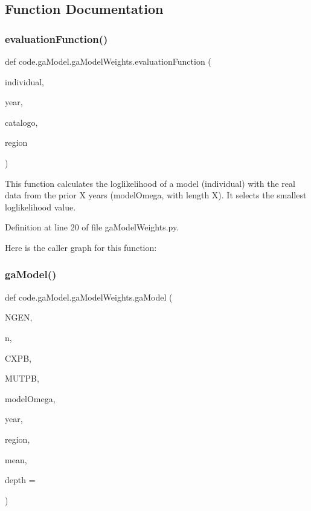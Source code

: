 \subsection{Function Documentation}
\mbox{\label{namespacecode_1_1ga_model_1_1ga_model_weights_a391a75f316a29e0dfba1b8adda65c526}} 
\subsubsection{\texorpdfstring{evaluation\+Function()}{evaluationFunction()}}
{\footnotesize\ttfamily def code.\+ga\+Model.\+ga\+Model\+Weights.\+evaluation\+Function (\begin{DoxyParamCaption}\item[{}]{individual,  }\item[{}]{year,  }\item[{}]{catalogo,  }\item[{}]{region }\end{DoxyParamCaption})}

\begin{DoxyVerb}This function calculates the loglikelihood of a model (individual) with 
the real data from the prior X years (modelOmega, with length X).
It selects the smallest loglikelihood value.
\end{DoxyVerb}
 

Definition at line 20 of file ga\+Model\+Weights.\+py.

Here is the caller graph for this function\+:
\mbox{\label{namespacecode_1_1ga_model_1_1ga_model_weights_ad5f42777ce1e884bfb1cc58fa17e432b}} 
\subsubsection{\texorpdfstring{ga\+Model()}{gaModel()}}
{\footnotesize\ttfamily def code.\+ga\+Model.\+ga\+Model\+Weights.\+ga\+Model (\begin{DoxyParamCaption}\item[{}]{N\+G\+EN,  }\item[{}]{n,  }\item[{}]{C\+X\+PB,  }\item[{}]{M\+U\+T\+PB,  }\item[{}]{model\+Omega,  }\item[{}]{year,  }\item[{}]{region,  }\item[{}]{mean,  }\item[{}]{depth = {} }\end{DoxyParamCaption})}

